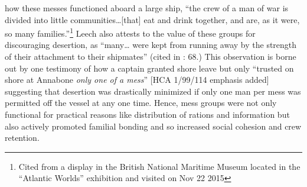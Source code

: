 how these messes functioned aboard a large ship, “the crew of a man of war is divided into little communities…[that] eat and drink together, and are, as it were, so many families.”\footnote{Cited from a display in the British National Maritime Museum located in the “Atlantic Worlds” exhibition and visited on Nov 22 2015} Leech also attests to the value of these groups for discouraging desertion, as “many… were kept from running away by the strength of their attachment to their shipmates” (cited in \citealt{AdkinsAdkins2008}: 68.) This observation is borne out by one testimony of how a captain granted shore leave but only “trusted on shore at Annabone \textit{only one of a mess}” [HCA 1/99/114 emphasis added] suggesting that desertion was drastically minimized if only one man per mess was permitted off the vessel at any one time. Hence, mess groups were not only functional for practical reasons like distribution of rations and information but also actively promoted familial bonding and so increased social cohesion and crew retention.  

